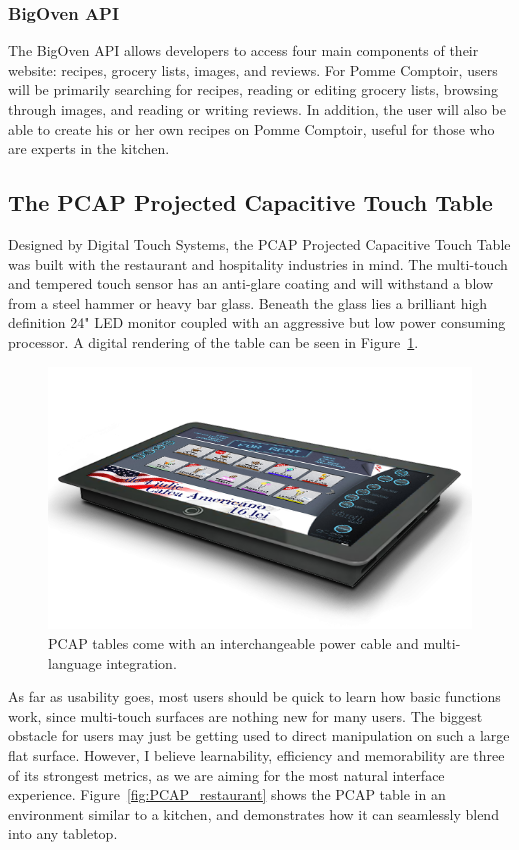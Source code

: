\documentclass[fleqn,10pt]{wlpeerj}
\begin{document}
\subsubsection*{BigOven API}
The BigOven API allows developers to access four main components of their website: recipes, grocery lists, images, and reviews. For Pomme Comptoir, users will be primarily searching for recipes, reading or editing grocery lists, browsing through images, and reading or writing reviews. In addition, the user will also be able to create his or her own recipes on Pomme Comptoir, useful for those who are experts in the kitchen.

\subsection*{The PCAP Projected Capacitive Touch Table}

Designed by Digital Touch Systems, the PCAP Projected Capacitive Touch Table was built with the restaurant and hospitality industries in mind. The multi-touch and tempered touch sensor has an anti-glare coating and will withstand a blow from a steel hammer or heavy bar glass. Beneath the glass lies a brilliant high definition 24" LED monitor coupled with an aggressive but low power consuming processor.\cite{DTS} A digital rendering of the table can be seen in Figure~\ref{fig:PCAP}.

\begin{figure}[ht]
\centering
\includegraphics[width=\linewidth]{PCAP.png}
\caption{PCAP tables come with an interchangeable power cable and multi-language integration.}
\label{fig:PCAP}
\end{figure}

As far as usability goes, most users should be quick to learn how basic functions work, since multi-touch surfaces are nothing new for many users. The biggest obstacle for users may just be getting used to direct manipulation on such a large flat surface. However, I believe learnability, efficiency and memorability are three of its strongest metrics, as we are aiming for the most natural interface experience. Figure~\ref{fig:PCAP_restaurant} shows the PCAP table in an environment similar to a kitchen, and demonstrates how it can seamlessly blend into any tabletop.
\end{document}

